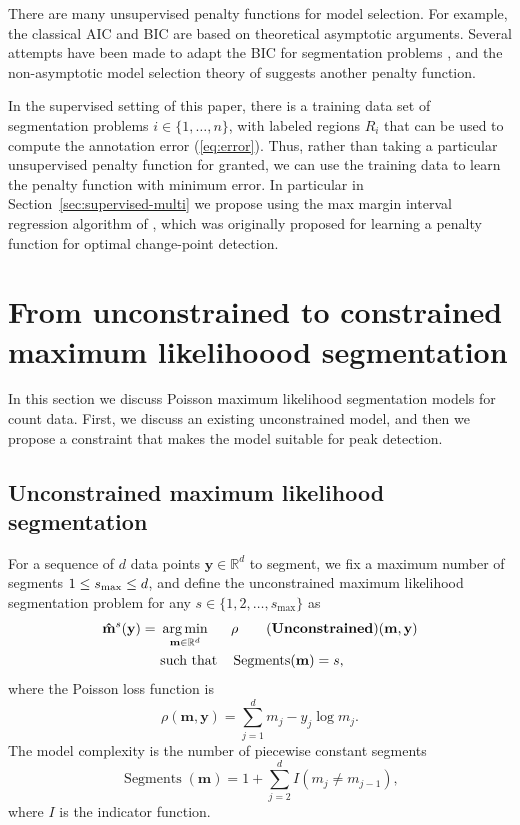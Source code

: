 \documentclass{article}
\DeclareMathOperator*{\argmin}{arg\,min}
\DeclareMathOperator*{\Segments}{Segments}
\newcommand{\RR}{\mathbb R}
\begin{document}
There are many unsupervised penalty functions for model selection. For
example, the classical AIC \citep{Akaike73} and BIC \citep{Schwarz78} are based
on theoretical asymptotic arguments. Several attempts have been made
to adapt the BIC for segmentation problems \citep{Yao88,
  mBIC}, and the non-asymptotic model selection theory of
\citet{cleynen2013segmentation} suggests another penalty function.

In the supervised setting of this paper, there is a training data set
of segmentation problems $i\in\{1, \dots, n\}$, with labeled regions
$R_i$ that can be used to compute the annotation error
(\ref{eq:error}). Thus, rather than taking a particular unsupervised
penalty function for granted, we can use the training data to learn
the penalty function with minimum error. In particular in
Section~\ref{sec:supervised-multi} we propose using the max margin interval
regression algorithm of \citet{HOCKING-penalties}, which was
originally proposed for learning a penalty function for optimal
change-point detection.

\section{From unconstrained to constrained maximum likelihoood
  segmentation}
\label{sec:model}

In this section we discuss Poisson maximum likelihood segmentation
models for count data. First, we discuss an existing unconstrained
model, and then we propose a constraint that makes the model suitable
for peak detection.

\subsection{Unconstrained maximum likelihood segmentation}

For a sequence of $d$ data points $\mathbf y\in\RR^d$ to segment, we
fix a maximum number of segments $1 \leq s_{\text{\text{max}}}\leq d$,
and define the unconstrained maximum likelihood segmentation problem
for any $s\in\{1, 2, \dots, s_{\max}\}$ as
\begin{align*}
  \label{unconstrained}
  \mathbf{\hat m}^s(\mathbf y)  =\ 
  &\argmin_{\mathbf m\in\RR^{d}} && 
  \rho
  \tag{\textbf{Unconstrained}}
  (\mathbf m, \mathbf y) \\
  &\text{such that} && \Segments(\mathbf m)=s,
\end{align*}
where the Poisson loss function is
\begin{equation}
  \rho(\mathbf m, \mathbf y)= \sum_{j=1}^d m_j - y_j \log m_j.
\end{equation} 
The model complexity is the number of piecewise constant segments
\begin{equation}
  \Segments(\mathbf m)=1+\sum_{j=2}^d I(m_j \neq m_{j-1}),
\end{equation}
where $I$ is the indicator function. 
\end{document}
